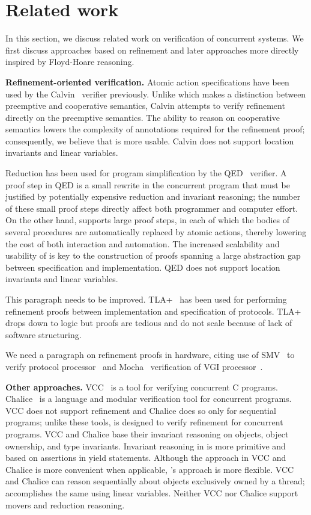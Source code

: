 \section{Related work}
\label{sec:related}

In this section, we discuss related work on verification of concurrent systems.
We first discuss approaches based on refinement and later approaches more directly inspired 
by Floyd-Hoare reasoning.

{\bf Refinement-oriented verification.}
Atomic action specifications have been used by the Calvin~\cite{FlanaganFQS05} verifier previously.
Unlike \civl which makes a distinction between preemptive and cooperative semantics,
Calvin attempts to verify refinement directly on the preemptive semantics.
The ability to reason on cooperative semantics lowers the complexity of annotations 
required for the refinement proof; consequently, we believe that \civl is more usable.
Calvin does not support location invariants and linear variables. 

Reduction has been used for program simplification by the QED~\cite{ElmasQT09} verifier.
A proof step in QED is a small rewrite in the concurrent program
that must be justified by potentially expensive reduction and invariant reasoning;
the number of these small proof steps directly affect both programmer and computer effort.
On the other hand, \civl supports large proof steps, in each of which the bodies of several procedures
are automatically replaced by atomic actions, thereby lowering the cost of both interaction and automation.
The increased scalability and usability of \civl is key to the construction of proofs spanning a large abstraction gap
between specification and implementation.
QED does not support location invariants and linear variables. 

This paragraph needs to be improved.
TLA+~\cite{Lamport2004} has been used for performing refinement proofs between implementation and specification of protocols.
TLA+ drops down to logic but proofs are tedious and do not scale because of lack of software structuring.

We need a paragraph on refinement proofs in hardware, citing use of SMV~\cite{McMillan00} to verify protocol processor~\cite{Eiriksson2000} 
and Mocha~\cite{AlurHMQRT98} verification of VGI processor~\cite{Henzinger1999}.

{\bf Other approaches.}
VCC~\cite{VCC} is a tool for verifying concurrent C programs.  
Chalice~\cite{LM09} is a language and modular verification tool for concurrent programs. 
VCC does not support refinement and Chalice does so only for sequential programs;
unlike these tools, \civl is designed to verify refinement for concurrent programs.  
VCC and Chalice base their invariant reasoning on objects, object ownership, and type invariants. 
Invariant reasoning in \civl is more primitive and based on assertions in yield statements. 
Although the approach in VCC and Chalice is more convenient when applicable, \civl's approach is more flexible. 
VCC and Chalice can reason sequentially about objects exclusively owned by a thread;
\civl accomplishes the same using linear variables.
Neither VCC nor Chalice support movers and reduction reasoning.

